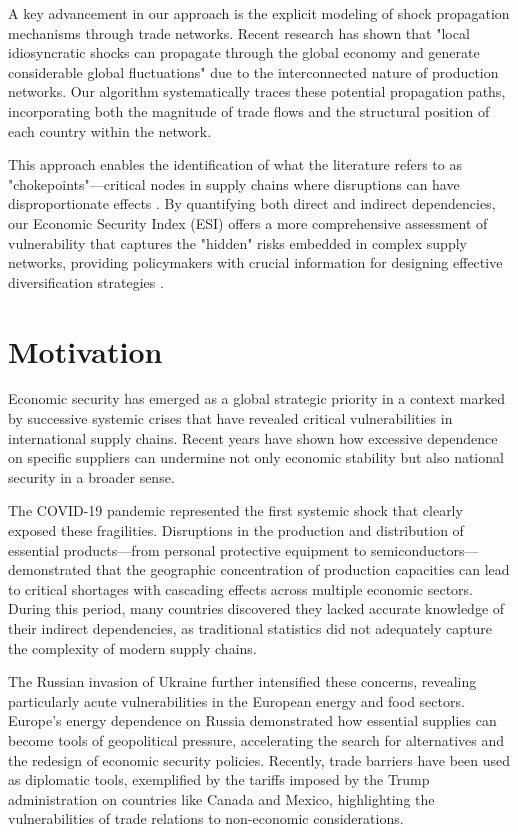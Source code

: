 \documentclass[final,1p,times,authoryear]{elsarticle}
\begin{document}
A key advancement in our approach is the explicit modeling of shock propagation mechanisms through trade networks. Recent research has shown that "local idiosyncratic shocks can propagate through the global economy and generate considerable global fluctuations" \cite{frontiers2025agricultural} due to the interconnected nature of production networks. Our algorithm systematically traces these potential propagation paths, incorporating both the magnitude of trade flows and the structural position of each country within the network.

This approach enables the identification of what the literature refers to as "chokepoints"—critical nodes in supply chains where disruptions can have disproportionate effects \cite{ascm2025chokepoints}. By quantifying both direct and indirect dependencies, our Economic Security Index (ESI) offers a more comprehensive assessment of vulnerability that captures the "hidden" risks embedded in complex supply networks, providing policymakers with crucial information for designing effective diversification strategies \cite{herman2017identifying}.

\section{Motivation}

Economic security has emerged as a global strategic priority in a context marked by successive systemic crises that have revealed critical vulnerabilities in international supply chains. Recent years have shown how excessive dependence on specific suppliers can undermine not only economic stability but also national security in a broader sense.

The COVID-19 pandemic represented the first systemic shock that clearly exposed these fragilities. Disruptions in the production and distribution of essential products—from personal protective equipment to semiconductors—demonstrated that the geographic concentration of production capacities can lead to critical shortages with cascading effects across multiple economic sectors. During this period, many countries discovered they lacked accurate knowledge of their indirect dependencies, as traditional statistics did not adequately capture the complexity of modern supply chains.

The Russian invasion of Ukraine further intensified these concerns, revealing particularly acute vulnerabilities in the European energy and food sectors. Europe's energy dependence on Russia demonstrated how essential supplies can become tools of geopolitical pressure, accelerating the search for alternatives and the redesign of economic security policies. Recently, trade barriers have been used as diplomatic tools, exemplified by the tariffs imposed by the Trump administration on countries like Canada and Mexico, highlighting the vulnerabilities of trade relations to non-economic considerations.
\end{document}
